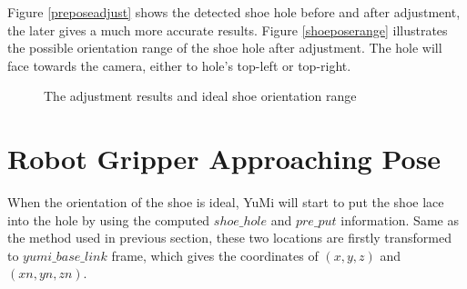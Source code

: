 Figure \ref{preposeadjust} shows the detected shoe hole before and after adjustment, the later gives a much more accurate results. Figure \ref{shoeposerange} illustrates the possible orientation range of the shoe hole after adjustment. The hole will face towards the camera, either to hole's top-left or top-right.

\begin{figure}[H]
\centering
{}
\caption{The adjustment results and ideal shoe orientation range}
\end{figure}


\section{Robot Gripper Approaching Pose} \label{approachposegripper}
When the orientation of the shoe is ideal, YuMi will start to put the shoe lace into the hole by using the computed $shoe\_hole$ and $pre\_put$ information. Same as the method used in previous section, these two locations are firstly transformed to $yumi\_base\_link$ frame, which gives the coordinates of $(x, y, z)$ and $(xn, yn, zn)$.

